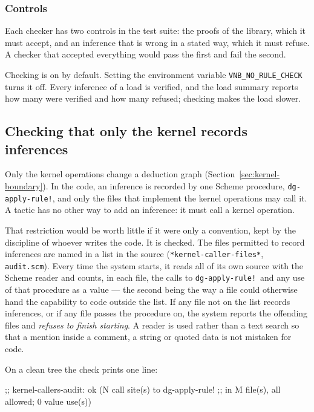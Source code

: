 \subsubsection*{Controls}

Each checker has two controls in the test suite: the proofs of the
library, which it must accept, and an inference that is wrong in a
stated way, which it must refuse.  A checker that accepted everything
would pass the first and fail the second.

\begin{remark}
Checking is on by default.  Setting the environment variable
\texttt{VNB\_NO\_RULE\_CHECK} turns it off.  Every inference of a load is
verified, and the load summary reports how many were verified and how many
refused; checking makes the load slower.
\end{remark}

\subsection{Checking that only the kernel records inferences}\label{sec:kernel-checked}

Only the kernel operations change a deduction graph
(Section~\ref{sec:kernel-boundary}).  In the code, an inference is
recorded by one Scheme procedure, \texttt{dg-apply-rule!}, and only the
files that implement the kernel operations may call it.  A tactic has no
other way to add an inference: it must call a kernel operation.

That restriction would be worth little if it were only a convention,
kept by the discipline of whoever writes the code.  It is checked.  The
files permitted to record inferences are named in a list in the source
(\texttt{*kernel-caller-files*}, \texttt{audit.scm}).  Every time the system starts, it reads
all of its own source with the Scheme reader and counts, in each file,
the calls to \texttt{dg-apply-rule!}\ and any use of that procedure as a
value --- the second being the way a file could otherwise hand the
capability to code outside the list.  If any file not on the list records
inferences, or if any file passes the procedure on, the system reports
the offending files and \emph{refuses to finish starting}.  A reader is
used rather than a text search so that a mention inside a comment, a
string or quoted data is not mistaken for code.

On a clean tree the check prints one line:

\begin{VNBcode}
;; kernel-callers-audit: ok (N call site(s) to dg-apply-rule!
;;   in M file(s), all allowed; 0 value use(s))
\end{VNBcode}

